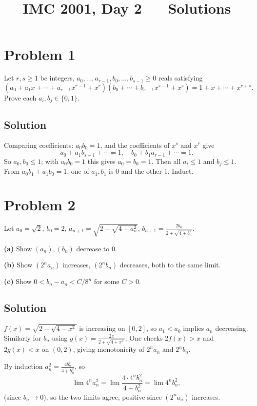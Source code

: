 \documentclass{article}
\title{IMC 2001, Day 2 --- Solutions}
\begin{document}
\maketitle

\section*{Problem 1}
Let $r,s\ge 1$ be integers, $a_0,\dots,a_{r-1}, b_0,\dots,b_{s-1}\ge 0$ reals satisfying
\[(a_0 + a_1 x + \cdots + a_{r-1}x^{r-1} + x^r)(b_0 + \cdots + b_{s-1}x^{s-1} + x^s) = 1 + x + \cdots + x^{r+s}.\]
Prove each $a_i, b_j \in \{0,1\}$.

\subsection*{Solution}
Comparing coefficients: $a_0 b_0 = 1$, and the coefficients of $x^{s}$ and $x^r$ give
\[a_0 + a_1 b_{s-1} + \cdots = 1,\quad b_0 + b_1 a_{r-1} + \cdots = 1.\]
So $a_0, b_0 \le 1$; with $a_0 b_0 = 1$ this gives $a_0 = b_0 = 1$. Then all $a_i \le 1$ and $b_j \le 1$. From $a_0 b_1 + a_1 b_0 = 1$, one of $a_1, b_1$ is $0$ and the other $1$. Induct.

\section*{Problem 2}
Let $a_0=\sqrt{2}$, $b_0=2$, $a_{n+1}=\sqrt{2-\sqrt{4-a_n^2}}$, $b_{n+1}=\frac{2b_n}{2+\sqrt{4+b_n^2}}$.

\textbf{(a)} Show $(a_n), (b_n)$ decrease to $0$.

\textbf{(b)} Show $(2^n a_n)$ increases, $(2^n b_n)$ decreases, both to the same limit.

\textbf{(c)} Show $0 < b_n - a_n < C/8^n$ for some $C>0$.

\subsection*{Solution}
$f(x)=\sqrt{2-\sqrt{4-x^2}}$ is increasing on $[0,2]$, so $a_1<a_0$ implies $a_n$ decreasing. Similarly for $b_n$ using $g(x)=\frac{2x}{2+\sqrt{4+x^2}}$. One checks $2f(x)>x$ and $2g(x)<x$ on $(0,2)$, giving monotonicity of $2^n a_n$ and $2^n b_n$.

By induction $a_n^2 = \frac{4b_n^2}{4+b_n^2}$, so
\[\lim 4^n a_n^2 = \lim \frac{4\cdot 4^n b_n^2}{4+b_n^2} = \lim 4^n b_n^2,\]
(since $b_n\to 0$), so the two limits agree, positive since $(2^n a_n)$ increases.
\end{document}
